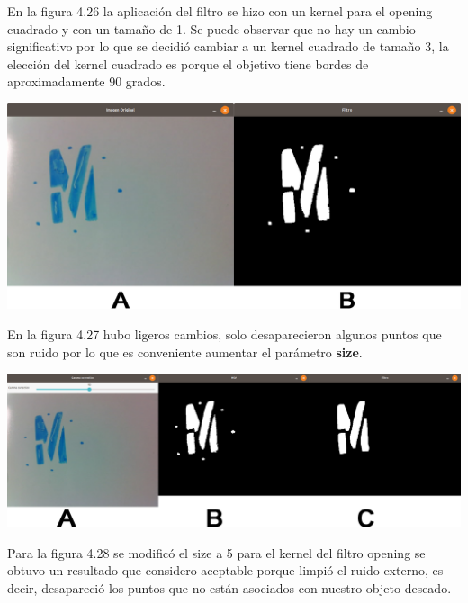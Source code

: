 En la figura 4.26 la aplicación del filtro se hizo con un kernel para el opening cuadrado y con un tamaño de 1.
Se puede observar que no hay un cambio significativo por lo que se decidió cambiar a un kernel cuadrado
de tamaño 3, la elección del kernel cuadrado es porque el objetivo tiene bordes de aproximadamente 90
grados.
\begin{center}
	\includegraphics[width=0.7 \textwidth]{Contenido/Cuerpo/Capitulo4/Fig17.eps}
	\label{Fig9}
\end{center}
En la figura 4.27 hubo ligeros cambios, solo desaparecieron algunos puntos que son ruido por lo que es conveniente aumentar
el parámetro \textbf{size}.
\begin{center}
	\includegraphics[width=0.7 \textwidth]{Contenido/Cuerpo/Capitulo4/Fig15.eps}
	\label{Fig9}
\end{center}
Para la figura 4.28 se modificó el size a 5 para el kernel del filtro opening se obtuvo un resultado que considero aceptable porque
limpió el ruido externo, es decir, desapareció los puntos que no están asociados con nuestro objeto deseado.


